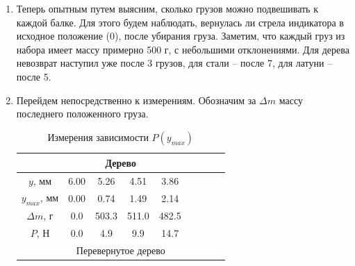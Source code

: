 \documentclass[12pt]{article}
\begin{document}
\begin{enumerate}
        \item Теперь опытным путем выясним, сколько грузов можно подвешивать
        к каждой балке. Для этого будем наблюдать, вернулась ли стрела индикатора
        в исходное положение (0), после убирания груза. Заметим, что каждый груз
        из набора имеет массу примерно 500 г, с небольшими отклонениями.
        Для дерева невозврат наступил уже после 3 грузов, для стали -- после 7,
        для латуни -- после 5.
        \item Перейдем непосредственно к измерениям. Обозначим за $\Delta m$ массу
        последнего положенного груза.
        \begin{table}
            \centering
            \caption{Измерения зависимости $P(y_{max})$}
            \begin{tabular}{|ccccccccc|}
            \hline
            \multicolumn{9}{|c|}{Дерево}                                                                                                                                                                                                                          \\ \hline
            \multicolumn{1}{|c|}{$y$, мм}       & \multicolumn{1}{c|}{6.00} & \multicolumn{1}{c|}{5.26}  & \multicolumn{1}{c|}{4.51}  & \multicolumn{1}{c|}{3.86}  & \multicolumn{1}{c|}{}      & \multicolumn{1}{c|}{}      & \multicolumn{1}{c|}{}      &       \\ \hline
            \multicolumn{1}{|c|}{$y_{max}$, мм} & \multicolumn{1}{c|}{0.00} & \multicolumn{1}{c|}{0.74}  & \multicolumn{1}{c|}{1.49}  & \multicolumn{1}{c|}{2.14}  & \multicolumn{1}{c|}{}      & \multicolumn{1}{c|}{}      & \multicolumn{1}{c|}{}      &       \\ \hline
            \multicolumn{1}{|c|}{$\Delta m$, г} & \multicolumn{1}{c|}{0.0}  & \multicolumn{1}{c|}{503.3} & \multicolumn{1}{c|}{511.0} & \multicolumn{1}{c|}{482.5} & \multicolumn{1}{c|}{}      & \multicolumn{1}{c|}{}      & \multicolumn{1}{c|}{}      &       \\ \hline
            \multicolumn{1}{|c|}{$P$, Н}        & \multicolumn{1}{c|}{0.0}  & \multicolumn{1}{c|}{4.9}   & \multicolumn{1}{c|}{9.9}   & \multicolumn{1}{c|}{14.7}  & \multicolumn{1}{c|}{}      & \multicolumn{1}{c|}{}      & \multicolumn{1}{c|}{}      &       \\ \hline
            \multicolumn{9}{|c|}{Перевернутое дерево}                                                                                                                                                                                                             \\ \hline

\end{tabular}
\end{table}
\end{enumerate}
\end{document}
